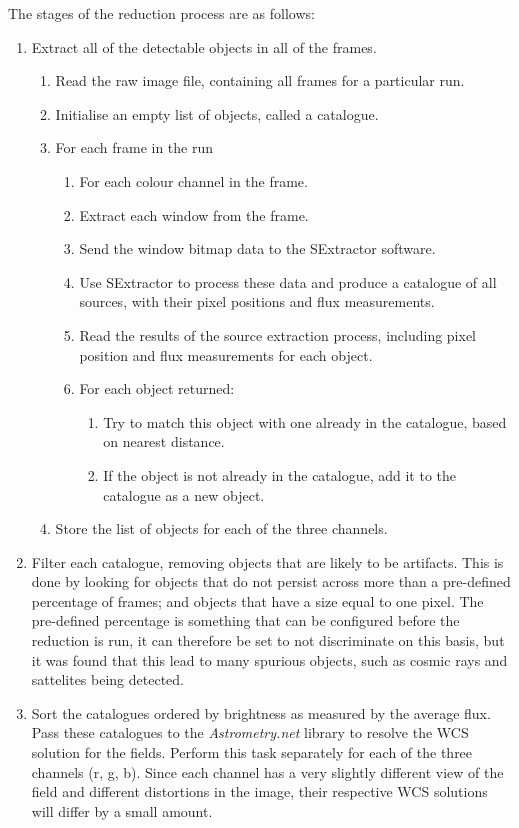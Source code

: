 The stages of the reduction process are as follows:
\begin{enumerate}
	\item Extract all of the detectable objects in all of the frames. 
	\begin{enumerate}
		\item Read the raw image file, containing all frames for a particular run.
		\item Initialise an empty list of objects, called a catalogue.
		\item For each frame in the run
		\begin{enumerate}
			\item For each colour channel in the frame.
			\item Extract each window from the frame.
			\item Send the window bitmap data to the SExtractor software.
			\item Use SExtractor to process these data and produce a catalogue of all sources, with their pixel positions and flux measurements.
			\item Read the results of the source extraction process, including pixel position and flux measurements for each object.
			\item For each object returned:
			\begin{enumerate} 
				\item Try to match this object with one already in the catalogue, based on nearest distance.
				\item If the object is not already in the catalogue, add it to the catalogue as a new object.
			\end{enumerate}
		\end{enumerate}
		\item Store the list of objects for each of the three channels.
	\end{enumerate}
	\item Filter each catalogue, removing objects that are likely to be artifacts. This is done by looking for objects that do not persist across more than a pre-defined percentage of frames; and objects that have a size equal to one pixel. The pre-defined percentage is something that can be configured before the reduction is run, it can therefore be set to not discriminate on this basis, but it was found that this lead to many spurious objects, such as cosmic rays and sattelites being detected. 
	\item Sort the catalogues ordered by brightness as measured by the average flux. Pass these catalogues to the \emph{Astrometry.net} library to resolve the WCS solution for the fields. Perform this task separately for each of the three channels (r, g, b). Since each channel has a very slightly different view of the field and different distortions in the image, their respective WCS solutions will differ by a small amount.

\end{enumerate}

